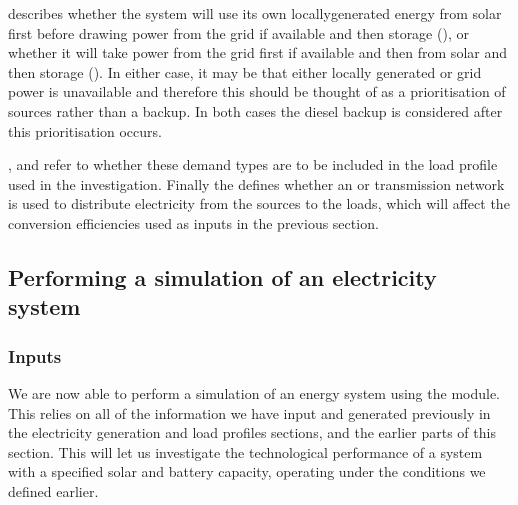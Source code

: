 \documentclass[letterpaper,10pt,english]{sphinxmanual}
\begin{document}
\sphinxAtStartPar
{} describes whether the system will use its
own locally\sphinxhyphen{}generated energy from solar first before drawing power from
the grid if available and then storage (), or whether it will take
power from the grid first if available and then from solar and then
storage (). In either case, it may be that either locally generated
or grid power is unavailable and therefore this should be thought of as
a prioritisation of sources rather than a backup. In both cases the
diesel backup is considered after this prioritisation occurs.

\sphinxAtStartPar
{},  and  refer to whether these
demand types are to be included in the load profile used in the
investigation. Finally the  defines whether an
 or  transmission network is used to distribute electricity
from the sources to the loads, which will affect the conversion
efficiencies used as inputs in the previous section.

\sphinxAtStartPar
{}  


\subsection{Performing a simulation of an electricity system}
\label{\detokenize{energy_system_simulation:performing-a-simulation-of-an-electricity-system}}

\subsubsection{Inputs}
\label{\detokenize{energy_system_simulation:inputs}}
\sphinxAtStartPar
We are now able to perform a simulation of an energy system using the
 module. This relies on all of the information we have
input and generated previously in the electricity
generation and load profiles sections, and the earlier parts of this
section. This will let us investigate the technological performance of a
system with a specified solar and battery capacity, operating under the
conditions we defined earlier.
\end{document}
